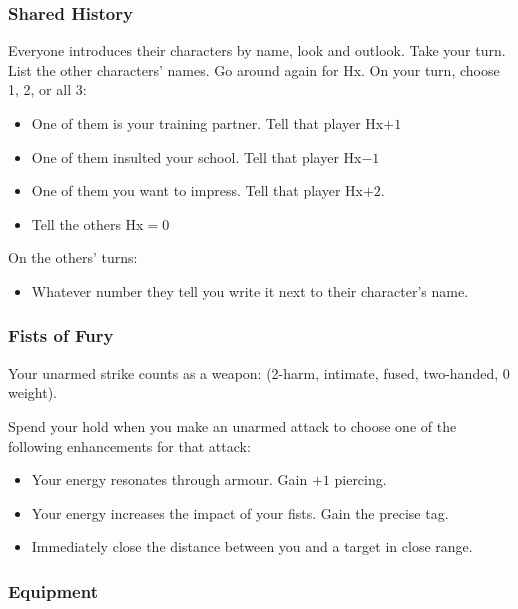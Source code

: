 \subsubsection{Shared History}
Everyone introduces their characters by name, look and outlook. Take
your turn. List the other characters' names. Go around again for
Hx. On your turn, choose 1, 2, or all 3:
\begin{itemize} %
\item One of them is your training partner. Tell that player Hx$+1$
\item One of them insulted your school. Tell that player Hx$-1$
\item One of them you want to impress. Tell that player Hx$+2$.
\item Tell the others Hx${=}0$
\end{itemize}
On the others’ turns:
\begin{itemize} %
\item Whatever number they tell you write it next to their character’s
  name.
\end{itemize}

\subsubsection{Fists of Fury}
Your unarmed strike counts as a weapon: (2-harm, intimate, fused, two-handed, 0 weight).


Spend your hold when you make an unarmed attack to choose one of the following enhancements for that attack:
\begin{itemize}
\item Your energy resonates through armour. Gain $+1$ piercing.
\item Your energy increases the impact of your fists. Gain the precise tag.
\item Immediately close the distance between you and a target in close range.
\end{itemize}

\subsubsection{Equipment}

